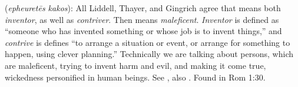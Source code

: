 \item[Maleficent contriver,]

(\textit{epheuretēs kakos}):
All Liddell, Thayer, and Gingrich agree that  means both \emph{inventor}, as well as \emph{contriver}. Then  means \emph{maleficent}. \emph{Inventor} is defined as ``someone who has invented something or whose job is to invent things,'' and \emph{contrive} is defines ``to arrange a situation or event, or arrange for something to happen, using clever planning.'' Technically we are talking about persons, which are maleficent, trying to invent harm and evil, and making it come true, wickedness personified in human beings. See , also .
Found in Rom 1:30.
